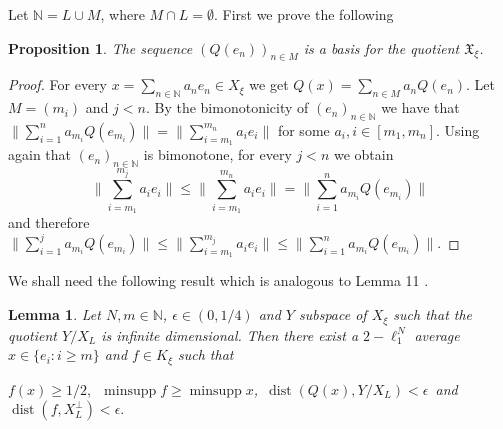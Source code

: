 \documentclass[a4paper]{amsart}
\theoremstyle{plain}
\newtheorem{lemma}[theorem]{Lemma}
\newtheorem{proposition}[theorem]{Proposition}
\newcommand{\N}{\mathbb{N}}
\newcommand{\e}{\epsilon}
\newcommand{\norm}[1][\cdot]{\lVert #1\rVert}
\DeclareMathOperator{\minsupp}{minsupp}
\DeclareMathOperator{\dist}{dist}
\begin{document}
Let $\N=L\cup M$, where $M\cap L=\emptyset$. First we prove the following
\begin{proposition}\label{p13.1}
The sequence  $(Q(e_{n}))_{n\in M}$ is a basis for the quotient $\mathfrak{X}_{\xi}$.
\end{proposition}
\begin{proof}For every
$x=\sum_{n \in\N}a_ne_n\in X_{\xi}$ we get
$Q(x)=\sum_{n\in M}a_nQ(e_n)$.
Let  $M=(m_i)$ and $j<n$. By the bimonotonicity of $(e_n)_{n\in\N}$ we have  that
$\norm[\sum_{i=1}^{n}a_{m_i}Q(e_{m_i})]=\norm[\sum_{i=m_1}^{m_n}a_{i}e_{i}]$ for some
$a_{i}, i\in [m_1,m_{n}]$. Using again that $(e_n)_{n\in\N}$  is bimonotone, for every
$j<n$ we obtain $$ \|\sum_{i=m_1}^{m_j}a_{i}e_{i}\| \leq
\|\sum_{i=m_1}^{m_n}a_{i}e_{i}\|= \|\sum_{i=1}^{n}a_{m_i}Q(e_{m_i})\|$$ and
therefore
$
\|\sum_{i=1}^{j}a_{m_i}Q(e_{m_i})\|\leq
\|\sum_{i=m_1}^{m_j}a_i{e}_{i}\| \leq
\|\sum_{i=1}^{n}a_{m_i}Q(e_{m_i})\|.
$
\end{proof}
We shall need the following  result which  is analogous to Lemma 11 \cite{F3}.
\begin{lemma}\label{lf}
Let $N,m\in\N$, $\e\in(0,1/4)$ and $Y$ subspace of $X_{\xi}$ such that  the quotient $Y/X_{L}$ is infinite dimensional.
Then there exist a $2-\ell_{1}^{N}$ average $x\in\{e_{i}:i\geq m\}$ and $f\in K_{\xi}$ such that
\begin{center}
\mbox{$f(x)\geq 1/2,\,\,\,\minsupp f\geq\minsupp x$,
$
\dist(Q(x), Y/X_{L})<\e$ and $\dist(f,
X_{L}^{\perp})<\e.$}
\end{center}
\end{lemma}
\end{document}
